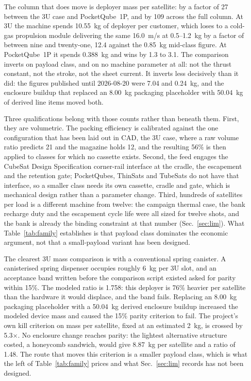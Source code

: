 \documentclass[conference]{IEEEtran}
\begin{document}
The column that does move is deployer mass per satellite: by a factor of 27 between the 3U case and PocketQube~1P, and by 109 across the full column. At 3U the machine spends 10.55~kg of deployer per customer, which loses to a cold-gas propulsion module delivering the same 16.0~m/s at 0.5--1.2~kg by a factor of between nine and twenty-one, 12.4 against the 0.85~kg mid-class figure. At PocketQube~1P it spends 0.388~kg and wins by 1.3 to 3.1. The comparison inverts on payload class, and on no machine parameter at all: not the thrust constant, not the stroke, not the sheet current. It inverts less decisively than it did: the figures published until 2026-08-20 were 7.04 and 0.24~kg, and the enclosure buildup that replaced an 8.00~kg packaging placeholder with 50.04~kg of derived line items moved both.

Three qualifications belong with those counts rather than beneath them. First, they are volumetric. The packing efficiency is calibrated against the one configuration that has been laid out in CAD, the 3U case, where a raw volume ratio predicts 21 and the magazine holds 12, and the resulting 56\% is then applied to classes for which no cassette exists. Second, the feed engages the CubeSat Design Specification corner-rail interface at the cradle, the escapement and the retention gate; PocketQubes, ThinSats and TubeSats do not have that interface, so a smaller class needs its own cassette, cradle and gate, which is mechanical design rather than a parameter change. Third, hundreds of satellites per load is a different machine from twelve: the campaign thermal case, the bank recharge duty and the escapement cycle life were all sized for twelve shots, and the bank is already the binding constraint at that number (Sec.~\ref{sec:lim}). What Table~\ref{tab:family} establishes is that payload class dominates the economic argument, not that a small-payload variant has been designed.

The clearest 3U mass comparison is with a conventional spring canister. A canisterised spring dispenser occupies roughly 6~kg per 3U slot, and an acceptance band written before the comparison script existed asked for parity within 15\%. The modeled ratio is 1.758: this deployer is 76\% heavier per satellite than the hardware it would displace, and the band fails. Replacing an 8.00~kg packaging placeholder with a 50.04~kg derived enclosure buildup increased the modeled device mass and caused the 15\% parity criterion to fail. The project's own kill criterion on mass per satellite, fixed at an estimated 2~kg, is crossed by 5.3$\times$. No enclosure change reaches parity: the lightest alternative structure costed, a honeycomb sandwich, would give 8.87~kg per satellite and a ratio of 1.48. The route that moves this criterion is a smaller payload class, which is what the left of Table~\ref{tab:family} prices and what Sec.~\ref{sec:lim} records has not been designed.
\end{document}
